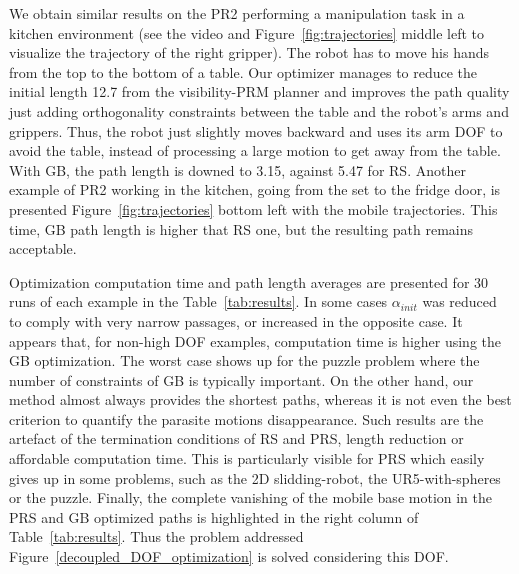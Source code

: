 \documentclass{tADR2e}
\begin{document}
We obtain similar results on the PR2 performing a manipulation task 
in a kitchen environment (see the video and Figure~\ref{fig:trajectories} middle 
left to visualize the trajectory of the right gripper). The robot has to move 
his hands from the top to the bottom of a table.
Our optimizer manages to reduce the initial length 12.7 from the visibility-PRM 
planner and improves the path quality 
just adding orthogonality constraints between the table and the 
robot's arms and grippers. Thus, the robot just slightly moves 
backward and uses its arm DOF to avoid the table, instead of 
processing a large motion to get away from the table. With GB, the path length is 
downed to 3.15, against 5.47 for RS.
Another example of PR2 working in the kitchen, going from the set to the fridge 
door, is presented Figure~\ref{fig:trajectories} bottom left with the mobile 
trajectories. This time, GB path length is higher that RS one, but the resulting 
path remains acceptable.

\vspace{0.4cm}

Optimization computation time and path length averages are presented for 30 runs of 
each example in the Table~\ref{tab:results}. In some cases $\alpha_{init}$ was reduced to comply with very narrow passages, or increased in the opposite case. 
It appears that, for non-high DOF examples, computation time is higher using the GB optimization. The worst case shows up for the puzzle problem where the number of constraints of GB is typically important.
On the other hand, our method almost always provides the shortest paths, whereas it is not even the best criterion to quantify the parasite motions disappearance.
Such results are the artefact of the termination conditions of RS and PRS, length reduction or affordable computation time. This is particularly visible for PRS which easily gives up in some problems, such as the 2D slidding-robot, the UR5-with-spheres or the puzzle.
Finally, the complete vanishing of the mobile base motion in the PRS and GB 
optimized paths is highlighted in the right column of Table~\ref{tab:results}. Thus 
the problem addressed Figure~\ref{decoupled_DOF_optimization} is solved considering 
this DOF.
\end{document}
